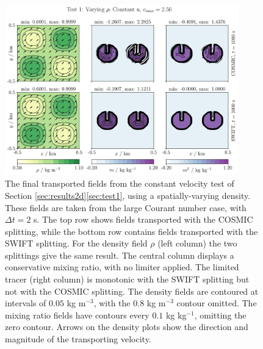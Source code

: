 \documentclass{ametsocV6.1}
\begin{document}
\begin{figure}[h!]
\centering
\includegraphics[width=0.9\textwidth]{fig_2_const_wind.jpg}
\caption{The final transported fields from the constant velocity test of Section \ref{sec:results2d}\ref{sec:test1}, using a spatially-varying density. These fields are taken from the large Courant number case, with $\Delta t=2$ s. The top row shows fields transported with the COSMIC splitting, while the bottom row contains fields transported with the SWIFT splitting.
For the density field $\rho$ (left column) the two splittings give the same result.
The central column displays a conservative mixing ratio, with no limiter applied.
The limited tracer (right column) is monotonic with the SWIFT splitting but not with the COSMIC splitting.
The density fields are contoured at intervals of $0.05$ kg m$^{-3}$, with the $0.8$ kg m$^{-3}$ contour omitted.
The mixing ratio fields have contours every $0.1$ kg kg$^{-1}$, omitting the zero contour.
Arrows on the density plots show the direction and magnitude of the transporting velocity.}
\label{fig:test1}
\end{figure}
\end{document}
